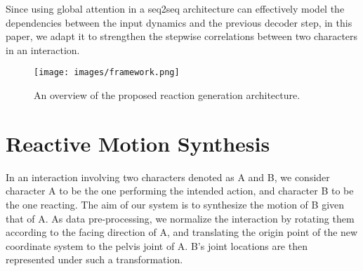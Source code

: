 \documentclass[times,twocolumn,final]{elsarticle}
\begin{document}
Since using global attention in a seq2seq architecture can effectively model the dependencies between the input dynamics and the previous decoder step, in this paper, we adapt it to strengthen the stepwise correlations between two characters in an interaction. 



\begin{figure*}[!t]
\centering\texttt{[image: images/framework.png]}
\caption{An overview of the proposed reaction generation architecture.}
\label{fig:1} 
\end{figure*}

\section{Reactive Motion Synthesis}
\label{sec:method}

In an interaction involving two characters denoted as A and B, we consider character A to be the one performing the intended action, and character B to be the one reacting. The aim of our system is to synthesize the motion of B given that of A. As data pre-processing, we normalize the interaction by rotating them according to the facing direction of A, and translating the origin point of the new coordinate system to the pelvis joint of A. B's joint locations are then represented under such a transformation. 
\end{document}
